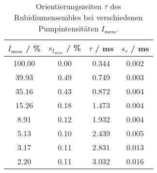 \begin{table}[H]
\caption{Orientierungszeiten $\tau$ des Rubidiumensembles bei verschiedenen Pumpintensitäten $I_{\text{mess}}$.}
\begin{center}
\begin{tabular}{|c|c|c|c|}
  \hline
  $I_\text{mess}$ / \% & $s_{I_\text{mess}}$ / \% & $\tau$ / ms & $s_\tau$ / ms \\ \hline
  100.00 & 0.00 & 0.344 & 0.002 \\ \hline
  39.93 & 0.49 & 0.749 & 0.003 \\ \hline
  35.16 & 0.43 & 0.872 & 0.004 \\ \hline
  15.26 & 0.18 & 1.473 & 0.004 \\ \hline
  8.91 & 0.12 & 1.932 & 0.004 \\ \hline
  5.13 & 0.10 & 2.439 & 0.005 \\ \hline
  3.17 & 0.11 & 2.831 & 0.013 \\ \hline
  2.20 & 0.11 & 3.032 & 0.016 \\ \hline
\end{tabular}
\end{center}
\label{tab:deh:fitres}
\end{table}
